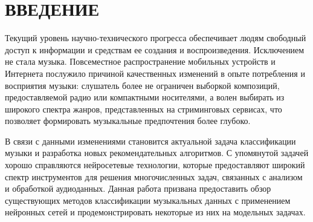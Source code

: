 \chapter*{\large ВВЕДЕНИЕ}  
Текущий уровень научно-технического прогресса обеспечивает 
людям свободный
доступ к информации и средствам ее создания и воспроизведения. Исключением не
стала музыка. Повсеместное распространение мобильных устройств и 
Интернета послужило причиной качественных изменений в опыте потребления и
восприятия музыки: слушатель более не ограничен выборкой композиций, предоставляемой
радио или компактными носителями, а волен выбирать из широкого спектра жанров,
представленных на стриминговых сервисах, что позволяет формировать музыкальные
предпочтения более глубоко.

В связи с данными изменениями становится актуальной задача
классификации музыки и разработка новых рекомендательных
алгоритмов. С упомянутой задачей хорошо справляются нейросетевые
технологии, которые предоставляют широкий спектр инструментов
для решения многочисленных задач, связанных с анализом и обработкой
аудиоданных. Данная работа призвана предоставить обзор
существующих методов классификации музыкальных данных с применением
нейронных сетей и продемонстрировать некоторые из них на
модельных задачах.


